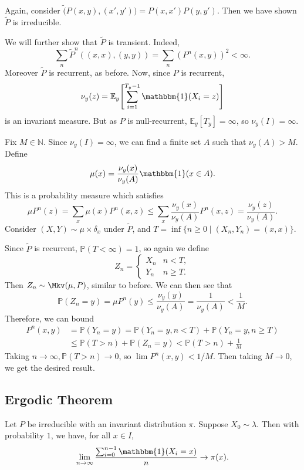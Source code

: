 \documentclass[12pt]{article}
\begin{document}
\begin{proofbox}
	Again, consider $\tilde(P(x, y), (x', y')) = P(x, x') P(y, y')$. Then we have shown $\tilde P$ is irreducible.

	We will further show that $\tilde P$ is transient. Indeed,
	\[
		\sum_{n} \tilde P^{n}((x, x), (y, y)) = \sum_{n} (P^{n}(x, y))^2 < \infty
	.\]
	Moreover $\tilde P$ is recurrent, as before. Now, since $P$ is recurrent,
	\[
		\nu_y(z) = \mathbb{E}_y\Biggl[\sum_{i = 1}^{T_y - 1} \mathbbm{1}(X_i = z) \Biggr]
	\]
	is an invariant measure. But as $P$ is null-recurrent, $\mathbb{E}_y[T_y] = \infty$, so $\nu_y(I) = \infty$.

	Fix $M \in \mathbb{N}$. Since $\nu_y(I) = \infty$, we can find a finite set $A$ such that $\nu_y(A) > M$. Define
	\[
		\mu(x) = \frac{\nu_y(x)}{\nu_y(A)} \mathbbm{1}(x \in A)
	.\]
	This is a probability measure which satisfies
	\[
		\mu P^{n}(z) = \sum_{x} \mu(x) P^{n}(x, z) \leq \sum_{x} \frac{\nu_y(x)}{\nu_y(A)} P^{n}(x, z) = \frac{\nu_y(z)}{\nu_y(A)}
	.\]
	Consider $(X, Y) \sim \mu \times \delta_x$ under $\tilde P$, and $T = \inf\{n \geq 0 \mid (X_n, Y_n) = (x, x)\}$.

	Since $\tilde P$ is recurrent, $\mathbb{P}(T < \infty) = 1$, so again we define
	\[
	Z_n =
	\begin{cases}
		X_n & n < T, \\
		Y_n & n \geq T.
	\end{cases}
	\]
	Then $Z_n \sim \Mkv(\mu, P)$, similar to before. We can then see that
	\[
		\mathbb{P}(Z_n = y) = \mu P^{n}(y) \leq \frac{\nu_y(y)}{\nu_y(A)} = \frac{1}{\nu_y(A)} < \frac{1}{M}
	.\]
	Therefore, we can bound
	\begin{align*}
		P^{n}(x, y) &= \mathbb{P}(Y_n = y) = \mathbb{P}(Y_n = y, n < T) + \mathbb{P}(Y_n = y, n \geq T) \\
			    &\leq \mathbb{P}(T > n) + \mathbb{P}(Z_n = y) < \mathbb{P}(T > n) + \frac{1}{M}
	\end{align*}
	Taking $n \to \infty, \mathbb{P}(T > n) \to 0$, so $\lim P^{n}(x, y) < 1/M$. Then taking $M \to 0$, we get the desired result.
\end{proofbox}

\newpage

\subsection{Ergodic Theorem}%
\label{sub:ergodic_theorem}

\begin{theorem}
	Let $P$ be irreducible with an invariant distribution $\pi$. Suppose $X_0 \sim \lambda$. Then with probability $1$, we have, for all $x \in I$,
	\[
		\lim_{n \to \infty} \frac{\sum_{i = 0}^{n-1} \mathbbm{1}(X_i = x)}{n} \to \pi(x)
	.\]
\end{theorem}
\end{document}
